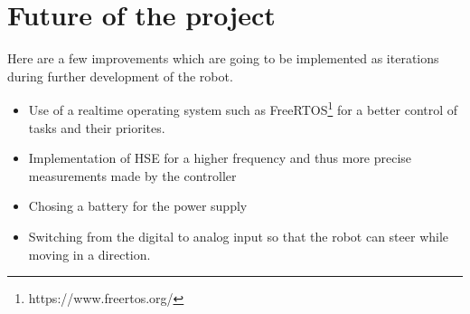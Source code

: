 \section{Future of the project}

Here are a few improvements which are going to be implemented as iterations during further development of the robot. 

\begin{itemize}
    \item Use of a realtime operating system such as FreeRTOS\footnote{https://www.freertos.org/} for a better control of tasks and their priorites.
    \item Implementation of HSE for a higher frequency and thus more precise measurements made by the controller
    \item Chosing a battery for the power supply
    \item Switching from the digital to analog input so that the robot can steer while moving in a direction.
\end{itemize}
